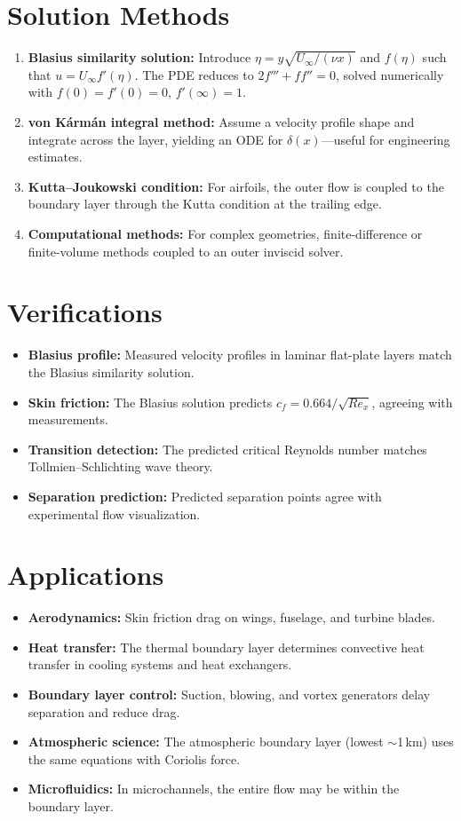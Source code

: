 \section*{Solution Methods}

\begin{enumerate}
\item \textbf{Blasius similarity solution:} Introduce $\eta = y\sqrt{U_\infty / (\nu x)}$ and $f(\eta)$ such that $u = U_\infty f'(\eta)$. The PDE reduces to $2f''' + f f'' = 0$, solved numerically with $f(0) = f'(0) = 0$, $f'(\infty) = 1$.
\item \textbf{von K\'{a}rm\'{a}n integral method:} Assume a velocity profile shape and integrate across the layer, yielding an ODE for $\delta(x)$---useful for engineering estimates.
\item \textbf{Kutta--Joukowski condition:} For airfoils, the outer flow is coupled to the boundary layer through the Kutta condition at the trailing edge.
\item \textbf{Computational methods:} For complex geometries, finite-difference or finite-volume methods coupled to an outer inviscid solver.
\end{enumerate}
\section*{Verifications}

\begin{itemize}
\item \textbf{Blasius profile:} Measured velocity profiles in laminar flat-plate layers match the Blasius similarity solution.
\item \textbf{Skin friction:} The Blasius solution predicts $c_f = 0.664/\sqrt{Re_x}$, agreeing with measurements.
\item \textbf{Transition detection:} The predicted critical Reynolds number matches Tollmien--Schlichting wave theory.
\item \textbf{Separation prediction:} Predicted separation points agree with experimental flow visualization.
\end{itemize}
\section*{Applications}

\begin{itemize}
\item \textbf{Aerodynamics:} Skin friction drag on wings, fuselage, and turbine blades.
\item \textbf{Heat transfer:} The thermal boundary layer determines convective heat transfer in cooling systems and heat exchangers.
\item \textbf{Boundary layer control:} Suction, blowing, and vortex generators delay separation and reduce drag.
\item \textbf{Atmospheric science:} The atmospheric boundary layer (lowest $\sim$1\,km) uses the same equations with Coriolis force.
\item \textbf{Microfluidics:} In microchannels, the entire flow may be within the boundary layer.
\end{itemize}
